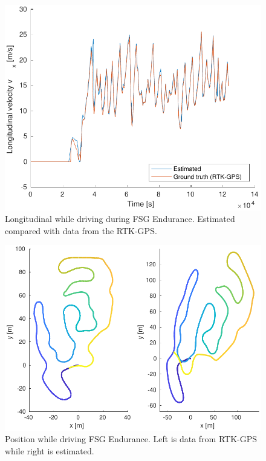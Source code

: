 \begin{figure}
    \centering
    \includegraphics[width=0.8\linewidth]{0_Images/6_Results/vxFSGEndurance.pdf}
    \caption[Longitudinal velocity while driving FSG Endurance.]
    {Longitudinal while driving  during FSG Endurance. Estimated compared with data from the RTK-GPS.}
    \label{Fig:VxFSGEndurance}
\end{figure}

\begin{figure}
    \centering
    \includegraphics[width=0.8\linewidth]{0_Images/6_Results/positionFSGEndurance.pdf}
    \caption[Position while driving FSG Endurance.]
    {Position while driving FSG Endurance. Left is data from RTK-GPS while right is estimated.}
    \label{Fig:PosFSGEndurance}
\end{figure}

